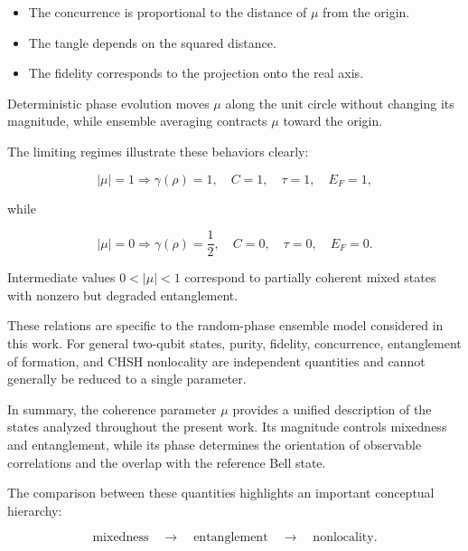 \begin{itemize}
    \item The concurrence is proportional to the distance of \( \mu \) from the origin.
    \item The tangle depends on the squared distance.
    \item The fidelity corresponds to the projection onto the real axis.
\end{itemize}

Deterministic phase evolution moves \( \mu \) along the unit circle without changing its magnitude, while ensemble averaging contracts \( \mu \) toward the origin.

\medskip

The limiting regimes illustrate these behaviors clearly:

\begin{equation}
|\mu|=1
\Rightarrow
\gamma(\rho)=1,
\quad
C=1,
\quad
\tau=1,
\quad
E_F=1,
\label{eq:coherence_parameter_limit_pure}
\end{equation}

while

\begin{equation}
|\mu|=0
\Rightarrow
\gamma(\rho)=\frac{1}{2},
\quad
C=0,
\quad
\tau=0,
\quad
E_F=0.
\label{eq:coherence_parameter_limit_mixed}
\end{equation}

Intermediate values \( 0<|\mu|<1 \) correspond to partially coherent mixed states with nonzero but degraded entanglement.

\medskip

These relations are specific to the random-phase ensemble model considered in this work. For general two-qubit states, purity, fidelity, concurrence, entanglement of formation, and CHSH nonlocality are independent quantities and cannot generally be reduced to a single parameter.

\medskip

In summary, the coherence parameter \( \mu \) provides a unified description of the states analyzed throughout the present work. Its magnitude controls mixedness and entanglement, while its phase determines the orientation of observable correlations and the overlap with the reference Bell state.

The comparison between these quantities highlights an important conceptual hierarchy:

\[
\text{mixedness}
\quad
\longrightarrow
\quad
\text{entanglement}
\quad
\longrightarrow
\quad
\text{nonlocality}.
\]

